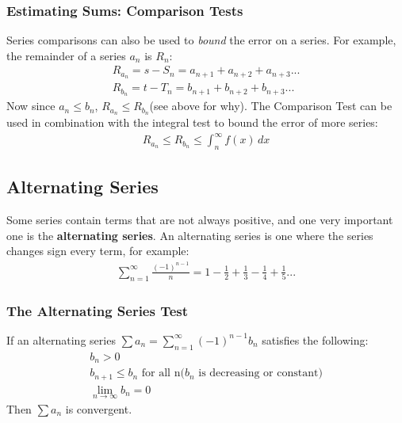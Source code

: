 \documentclass{article}
\begin{document}
\subsubsection{Estimating Sums: Comparison Tests}
Series comparisons can also be used to \textit{bound} the error on a series. For example, the remainder of a series $a_n$ is $R_n$:
\begin{gather*}
    R_{a_n} = s - S_n = a_{n+1} + a_{n+2} + a_{n+3}...\\
    R_{b_n} = t - T_n = b_{n+1} + b_{n+2} + b_{n+3}...
\end{gather*}
Now since $a_n \leqslant b_n$, $R_{a_n} \leqslant R_{b_n}$(see above for why). The Comparison Test can be used in combination with the integral test to bound the error of more series:
\begin{gather*}
    R_{a_n} \leqslant R_{b_n} \leqslant \int_n^\infty f(x)\hspace{2pt}dx
\end{gather*}
\subsection{Alternating Series}
Some series contain terms that are not always positive, and one very important one is the \textbf{alternating series}. An alternating series is one where the series changes sign every term, for example:
\begin{gather*}
    \sum_{n=1}^\infty \frac{(-1)^{n-1}}{n} = 1 - \frac{1}{2} + \frac{1}{3} - \frac{1}{4} + \frac{1}{5}...
\end{gather*}
\subsubsection{The Alternating Series Test}
If an alternating series $\sum a_n = \sum_{n=1}^\infty (-1)^{n-1}b_n$ satisfies the following:
\begin{gather}
    b_n > 0\\
    b_{n+1} \leqslant b_n \textrm{ for all n($b_n$ is decreasing or constant)}\\
    \lim_{n \to \infty} b_n = 0
\end{gather}
Then $\sum a_n$ is convergent.
\end{document}

